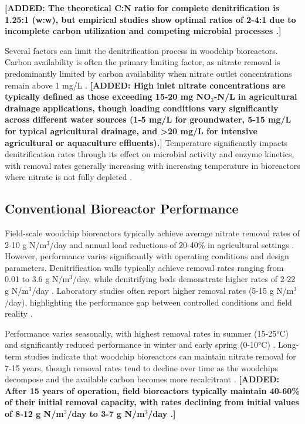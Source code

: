 \documentclass[12pt,a4paper]{article}
\newcommand{\added}[1]{\textcolor{addedtext}{\textbf{[ADDED: #1]}}}
\begin{document}
\added{The theoretical C:N ratio for complete denitrification is 1.25:1 (w:w), but empirical studies show optimal ratios of 2-4:1 due to incomplete carbon utilization and competing microbial processes \citep{RN725}.}

Several factors can limit the denitrification process in woodchip bioreactors. Carbon availability is often the primary limiting factor, as nitrate removal is predominantly limited by carbon availability when nitrate outlet concentrations remain above 1 mg/L \citep{RN629, RN242}. \added{High inlet nitrate concentrations are typically defined as those exceeding 15-20 mg NO$_3$-N/L in agricultural drainage applications, though loading conditions vary significantly across different water sources (1-5 mg/L for groundwater, 5-15 mg/L for typical agricultural drainage, and >20 mg/L for intensive agricultural or aquaculture effluents).} Temperature significantly impacts denitrification rates through its effect on microbial activity and enzyme kinetics, with removal rates generally increasing with increasing temperature in bioreactors where nitrate is not fully depleted \citep{RN625, RN228, RN258}.

\subsection{Conventional Bioreactor Performance}

Field-scale woodchip bioreactors typically achieve average nitrate removal rates of 2-10 g N/m$^3$/day and annual load reductions of 20-40\% in agricultural settings \citep{RN312, RN310}. However, performance varies significantly with operating conditions and design parameters. Denitrification walls typically achieve removal rates ranging from 0.01 to 3.6 g N/m$^3$/day, while denitrifying beds demonstrate higher rates of 2-22 g N/m$^3$/day \citep{RN625, RN629}. Laboratory studies often report higher removal rates (5-15 g N/m$^3$/day), highlighting the performance gap between controlled conditions and field reality \citep{RN611}.

Performance varies seasonally, with highest removal rates in summer (15-25°C) and significantly reduced performance in winter and early spring (0-10°C) \citep{RN214, RN228, RN258}. Long-term studies indicate that woodchip bioreactors can maintain nitrate removal for 7-15 years, though removal rates tend to decline over time as the woodchips decompose and the available carbon becomes more recalcitrant \citep{RN629, RN958}. \added{After 15 years of operation, field bioreactors typically maintain 40-60\% of their initial removal capacity, with rates declining from initial values of 8-12 g N/m$^3$/day to 3-7 g N/m$^3$/day \citep{RN958}.}
\end{document}
